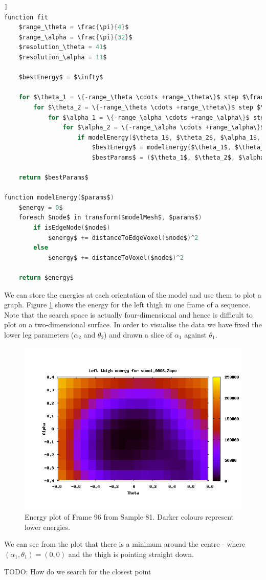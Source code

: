 \begin{lstlisting}[firstnumber=1,language=c,morekeywords={step,function,foreach,in},frame=single,mathescape=true,caption={Least squares fitting pseudo-code},label={leastsquarescode},float=[tb]]
function fit
	$range_\theta = \frac{\pi}{4}$
	$range_\alpha = \frac{\pi}{32}$
	$resolution_\theta = 41$
	$resolution_\alpha = 11$
	
	$bestEnergy$ = $\infty$
	
	for $\theta_1 = \{-range_\theta \cdots +range_\theta\}$ step $\frac{2range_\theta}{resolution_\theta}$
		for $\theta_2 = \{-range_\theta \cdots +range_\theta\}$ step $\frac{2range_\theta}{resolution_\theta}$
			for $\alpha_1 = \{-range_\alpha \cdots +range_\alpha\}$ step $\frac{2range_\alpha}{resolution_\alpha}$
				for $\alpha_2 = \{-range_\alpha \cdots +range_\alpha\}$ step $\frac{2range_\alpha}{resolution_\alpha}$
					if modelEnergy($\theta_1$, $\theta_2$, $\alpha_1$, $\alpha_2$) < $bestEnergy$
						$bestEnergy$ = modelEnergy($\theta_1$, $\theta_2$, $\alpha_1$, $\alpha_2$)
						$bestParams$ = ($\theta_1$, $\theta_2$, $\alpha_1$, $\alpha_2$)
	
	return $bestParams$

function modelEnergy($params$)
	$energy = 0$
	foreach $node$ in transform($modelMesh$, $params$)
		if isEdgeNode($node$)
			$energy$ += distanceToEdgeVoxel($node$)^2
		else
			$energy$ += distanceToVoxel($node$)^2
	
	return $energy$
\end{lstlisting}

We can store the energies at each orientation of the model and use them to plot a graph.
Figure \ref{EnergyPlot} shows the energy for the left thigh in one frame of a sequence.
Note that the search space is actually four-dimensional and hence is difficult to plot on a two-dimensional surface.
In order to visualise the data we have fixed the lower leg parameters ($\alpha_2$ and $\theta_2$) and drawn a slice of $\alpha_1$ against $\theta_1$.

\begin{figure}[tb]
	\centering
	\includegraphics[width=\textwidth]{problems/set81frame96-fixed-leftthigh.png}
	\caption{Energy plot of Frame 96 from Sample 81.
		Darker colours represent lower energies.}
	\label{EnergyPlot}
\end{figure}

We can see from the plot that there is a minimum around the centre - where $(\alpha_1, \theta_1) = (0, 0)$ and the thigh is pointing straight down.

TODO: How do we search for the closest point

